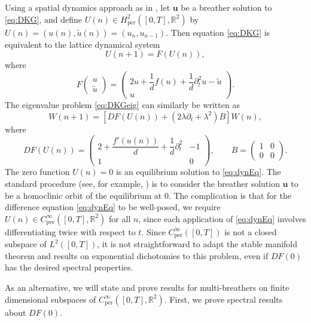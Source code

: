\documentclass[12pt,reqno]{amsart}
\def\R{{\mathbb R}}
\def\per{\textrm{per}}
\newcommand{\uvec}{\mathbf{u}}
\begin{document}
Using a spatial dynamics approach as in \cites{Parker2020,Parker2021}, let $\uvec$ be a breather solution to \cref{eq:DKG}, and define $U(n) \in H^2_\per([0,T], \R^2)$ by $U(n) = (u(n), \tilde{u}(n)) = ( u_n, u_{n-1} )$. Then equation \cref{eq:DKG} is equivalent to the lattice dynamical system
\begin{equation}\label{eq:dynEq}
U(n+1) = F(U(n)),
\end{equation}
where
\begin{equation}\label{eq:F}
F\begin{pmatrix}u \\ \tilde{u} \end{pmatrix} = 
\begin{pmatrix}2u  + \dfrac{1}{d}f(u) + \dfrac{1}{d} \partial_t^2 u - \tilde{u} \\
u
\end{pmatrix}.
\end{equation}
The eigenvalue problem \cref{eq:DKGeig} can similarly be written as 
\begin{equation}\label{eq:dynEVP}
W(n+1) = \left[ DF(U(n)) + (2 \lambda \partial_t + \lambda^2) B \right] W(n),
\end{equation}
where
\begin{equation}\label{eq:DF0}
DF(U(n)) = \begin{pmatrix}
2 + \dfrac{f'(u(n))}{d} + \dfrac{1}{d}\partial_t^2  & -1 \\ 1 & 0
\end{pmatrix}, \qquad
B = \begin{pmatrix} 1 & 0 \\ 0 & 0 \end{pmatrix}.
\end{equation}
The zero function $U(n) = 0$ is an equilibrium solution to \cref{eq:dynEq}. The standard procedure (see, for example, \cite{Parker2021,Parker2020,Sandstede1998}) is to consider the breather solution $\uvec$ to be a homoclinic orbit of the equilibrium at 0. The complication is that for the difference equation \cref{eq:dynEq} to be well-posed, we require $U(n) \in C_\per^\infty([0,T],\R^2)$ for all $n$, since each application of \cref{eq:dynEq} involves differentiating twice with respect to $t$. Since $C_\per^\infty([0,T])$ is not a closed subspace of $L^2([0,T])$, it is not straightforward to adapt the stable manifold theorem and results on exponential dichotomies to this problem, even if $DF(0)$ has the desired spectral properties.

As an alternative, we will state and prove results for multi-breathers on finite dimensional subspaces of $C_\per^\infty([0,T],\R^2)$. First, we prove spectral results about $DF(0)$.
\end{document}
